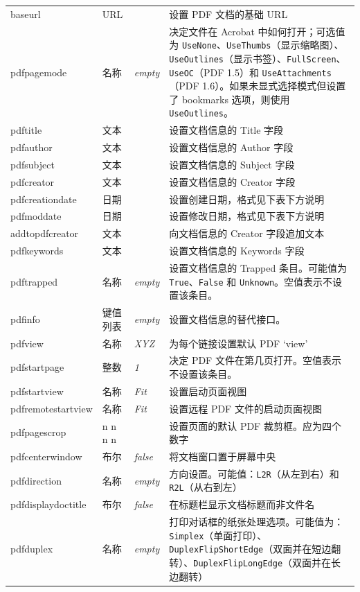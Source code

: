 \documentclass{article}
\begin{document}
\begin{longtable}{@{}>{\ttfamily}l>{\raggedright}p{}>{\itshape}lp{7cm}@{}}
baseurl            & URL     &       & 设置 PDF 文档的基础 URL \\
pdfpagemode        & 名称    & empty & 决定文件在 Acrobat 中如何打开；可选值为 \verb|UseNone|、\verb|UseThumbs|（显示缩略图）、\verb|UseOutlines|（显示书签）、\verb|FullScreen|、\verb|UseOC|（PDF 1.5）和 \verb|UseAttachments|（PDF 1.6）。如果未显式选择模式但设置了 bookmarks 选项，则使用 \verb|UseOutlines|。\\
pdftitle           & 文本    &       & 设置文档信息的 Title 字段\\
pdfauthor          & 文本    &       & 设置文档信息的 Author 字段\\
pdfsubject         & 文本    &       & 设置文档信息的 Subject 字段\\
pdfcreator         & 文本    &       & 设置文档信息的 Creator 字段\\
pdfcreationdate    & 日期    &       & 设置创建日期，格式见下表下方说明\\
pdfmoddate         & 日期    &       & 设置修改日期，格式见下表下方说明\\
addtopdfcreator    & 文本    &       & 向文档信息的 Creator 字段追加文本\\
pdfkeywords        & 文本    &       & 设置文档信息的 Keywords 字段\\
pdftrapped         & 名称    & empty & 设置文档信息的 Trapped 条目。可能值为 \verb|True|、\verb|False| 和 \verb|Unknown|。空值表示不设置该条目。\\
%
pdfinfo            & 键值列表 & empty & 设置文档信息的替代接口。\\
pdfview            & 名称    & XYZ   & 为每个链接设置默认 PDF `view'\\
pdfstartpage       & 整数    & 1     & 决定 PDF 文件在第几页打开。空值表示不设置该条目。\\
pdfstartview       & 名称    & Fit   & 设置启动页面视图\\
pdfremotestartview & 名称    & Fit   & 设置远程 PDF 文件的启动页面视图\\
pdfpagescrop       & n n n n &       & 设置页面的默认 PDF 裁剪框。应为四个数字\\
pdfcenterwindow    & 布尔    & false & 将文档窗口置于屏幕中央\\
pdfdirection       & 名称    & empty & 方向设置。可能值：\verb|L2R|（从左到右）和 \verb|R2L|（从右到左）\\
pdfdisplaydoctitle & 布尔    & false & 在标题栏显示文档标题而非文件名\\
pdfduplex          & 名称    & empty & 打印对话框的纸张处理选项。可能值为：\verb|Simplex|（单面打印）、\verb|DuplexFlipShortEdge|（双面并在短边翻转）、\verb|DuplexFlipLongEdge|（双面并在长边翻转）\\


\end{longtable}
\end{document}
